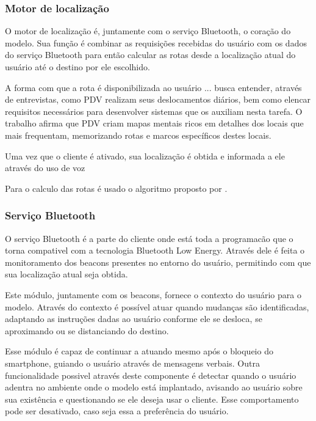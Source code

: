 \documentclass[english,brazilian]{UNISINOSmonografia}
\begin{document}
		\subsubsection{Motor de localização}
O motor de localização é, juntamente com o serviço Bluetooth, o coração do modelo. Sua função é combinar as requisições recebidas do usuário com os dados do serviço Bluetooth para então calcular as rotas desde a localização atual do usuário até o destino por ele escolhido. 

A forma com que a rota é disponibilizada ao usuário ...
 busca entender, através de entrevistas, como PDV realizam seus deslocamentos diários, bem como elencar requisitos necessários para desenvolver sistemas que os auxiliam nesta tarefa. O trabalho afirma que PDV criam mapas mentais ricos em detalhes dos locais que mais frequentam, memorizando rotas e marcos específicos destes locais. 

Uma vez que o cliente é ativado, sua localização é obtida e informada a ele através do uso de voz


Para o calculo das rotas é usado o algoritmo proposto por .









	\subsubsection{Serviço Bluetooth}
O serviço Bluetooth é a parte do cliente onde está toda a programacão que o torna compativel com a tecnologia Bluetooth Low Energy. Através dele é feita o monitoramento dos beacons presentes no entorno do usuário, permitindo com que sua localização atual seja obtida.

Este módulo, juntamente com os beacons, fornece o contexto do usuário para o modelo. Através do contexto é possível atuar quando mudanças são identificadas, adaptando as instruções dadas ao usuário conforme ele se desloca, se aproximando ou se distanciando do destino.

Esse módulo é capaz de continuar a atuando mesmo após o bloqueio do smartphone, guiando o usuário através de mensagens verbais. Outra funcionalidade possivel através deste componente é detectar quando o usuário adentra no ambiente onde o modelo está implantado, avisando ao usuário sobre sua existência e questionando se ele deseja usar o cliente. Esse comportamento pode ser desativado, caso seja essa a preferência do usuário.
\end{document}
